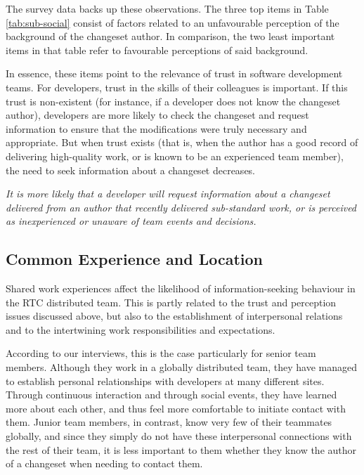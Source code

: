 \documentclass{sig-alternate}
\newenvironment{note}%
{\medskip
\noindent
\vspace{2pt}
\let\emph=\textbf
\begin{boxedminipage}{.99\columnwidth}\em}%
{\end{boxedminipage}}
\begin{document}
The survey data backs up these observations. The three top items in Table \ref{tab:sub-social} consist of factors related to an unfavourable perception of the background of the changeset author. In comparison, the two least important items in that table refer to favourable perceptions of said background.

In essence, these items point to the relevance of trust in software development teams. For developers, trust in the skills of their colleagues is important. If this trust is non-existent (for instance, if a developer does not know the changeset author), developers are more likely to check the changeset and request information to ensure that the modifications were truly necessary and appropriate. But when trust exists (that is, when the author has a good record of delivering high-quality work, or is known to be an experienced team member), the need to seek information about a changeset decreases. 

\begin{note}
It is more likely that a developer will request information about a changeset delivered from an author that recently delivered sub-standard work, or is perceived as inexperienced or unaware of team events and decisions.
\end{note}




\subsection{Common Experience and Location}

Shared work experiences affect the likelihood of information-seeking behaviour in the RTC distributed team. This is partly related to the trust and perception issues discussed above, but also to the establishment of interpersonal relations and to the intertwining work responsibilities and expectations.

According to our interviews, this is the case particularly for senior team members. Although they work in a globally distributed team, they have managed to establish personal relationships with developers at many different sites. Through continuous interaction and through social events, they have learned more about each other, and thus feel more comfortable to initiate contact with them. Junior team members, in contrast, know very few of their teammates globally, and since they simply do not have these interpersonal connections with the rest of their team, it is less important to them whether they know the author of a changeset when needing to contact them.
\end{document}

